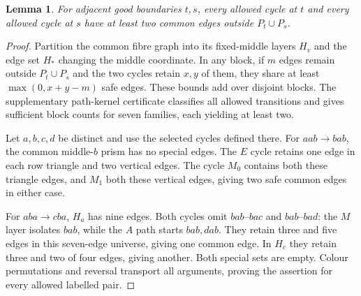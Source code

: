 \documentclass[11pt]{article}
\newtheorem{lemma}[theorem]{Lemma}
\theoremstyle{remark}
\numberwithin{equation}{section}
\numberwithin{table}{section}
\begin{document}
\begin{lemma}\label{lem:pathsafe}
For adjacent good boundaries $t,s$, every allowed cycle at $t$ and
every allowed cycle at $s$ have at least two common edges outside
$P_t\cup P_s$.
\end{lemma}
\begin{proof}
Partition the common fibre graph into its fixed-middle layers $H_v$
and the edge set $H_*$ changing the middle coordinate. In any block,
if $m$ edges remain outside $P_t\cup P_s$ and the two cycles retain
$x,y$ of them, they share at least $\max(0,x+y-m)$ safe edges.
These bounds add over disjoint blocks. The supplementary path-kernel certificate
classifies all allowed transitions and gives sufficient block counts
for seven families, each yielding at least two.

Let $a,b,c,d$ be distinct and use the selected cycles defined there.
For $aab\to bab$, the common middle-$b$ prism has no special edges.
The $E$ cycle retains one edge in each row triangle and two vertical
edges. The cycle $M_0$ contains both these triangle edges, and $M_1$
both these vertical edges, giving two safe common edges in either case.

For $aba\to cba$, $H_a$ has nine edges. Both cycles omit
$bab$--$bac$ and $bab$--$bad$: the $M$ layer isolates $bab$, while
the $A$ path starts $bab,dab$. They retain three and five edges in
this seven-edge universe, giving one common edge. In $H_c$ they
retain three and two of four edges, giving another. Both special
sets are empty. Colour permutations and reversal transport all
arguments, proving the assertion for every allowed labelled pair.
\end{proof}
\end{document}
